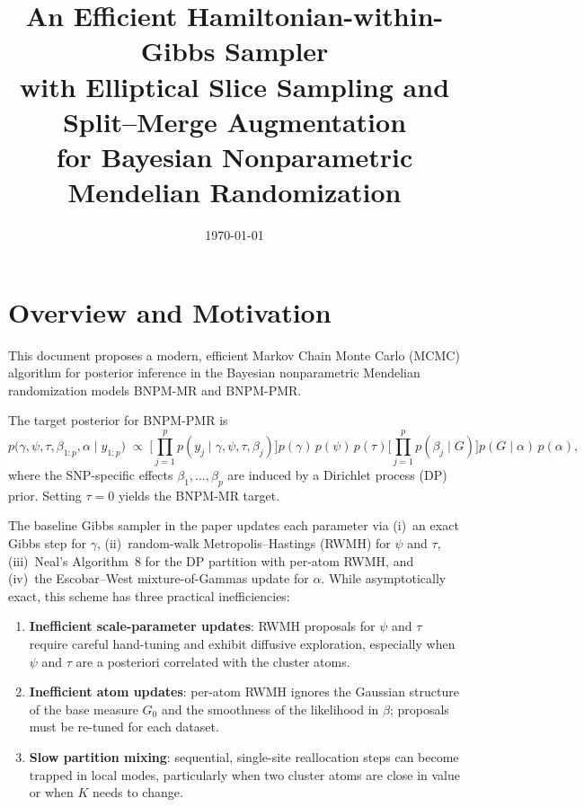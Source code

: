 \documentclass[12pt, a4paper]{article}
\title{\textbf{An Efficient Hamiltonian-within-Gibbs Sampler\\[6pt]
       with Elliptical Slice Sampling and Split--Merge Augmentation\\[6pt]
       for Bayesian Nonparametric Mendelian Randomization}}
\author{}
\date{\today}
\theoremstyle{remark}
\begin{document}
\maketitle
\tableofcontents
\newpage

\section{Overview and Motivation}

This document proposes a modern, efficient Markov Chain Monte Carlo
(MCMC) algorithm for posterior inference in the Bayesian nonparametric
Mendelian randomization models BNPM-MR and BNPM-PMR.

The target posterior for BNPM-PMR is
\begin{equation}
  p\!\bigl(\gamma,\psi,\tau,\beta_{1:p},\alpha \mid y_{1:p}\bigr)
  \;\propto\;
  \Biggl[\prod_{j=1}^p p(y_j \mid \gamma,\psi,\tau,\beta_j)\Biggr]
  p(\gamma)\,p(\psi)\,p(\tau)
  \Biggl[\prod_{j=1}^p p(\beta_j \mid G)\Biggr]
  p(G \mid \alpha)\,p(\alpha),
\label{eq:target}
\end{equation}
where the SNP-specific effects $\beta_1,\ldots,\beta_p$ are induced by
a Dirichlet process (DP) prior.
Setting $\tau=0$ yields the BNPM-MR target.

The baseline Gibbs sampler in the paper updates each parameter via
(i)~an exact Gibbs step for $\gamma$, (ii)~random-walk Metropolis--Hastings
(RWMH) for $\psi$ and $\tau$, (iii)~Neal's Algorithm~8 for the DP
partition with per-atom RWMH, and (iv)~the Escobar--West
mixture-of-Gammas update for $\alpha$.
While asymptotically exact, this scheme has three practical
inefficiencies:
\begin{enumerate}[leftmargin=*, itemsep=2pt]
  \item \textbf{Inefficient scale-parameter updates}: RWMH proposals
    for $\psi$ and $\tau$ require careful hand-tuning and exhibit
    diffusive exploration, especially when $\psi$ and $\tau$ are
    a posteriori correlated with the cluster atoms.
  \item \textbf{Inefficient atom updates}: per-atom RWMH ignores the
    Gaussian structure of the base measure $G_0$ and the smoothness of
    the likelihood in $\beta$; proposals must be re-tuned for each
    dataset.
  \item \textbf{Slow partition mixing}: sequential, single-site
    reallocation steps can become trapped in local modes, particularly
    when two cluster atoms are close in value or when $K$ needs to
    change.
\end{enumerate}
\end{document}
